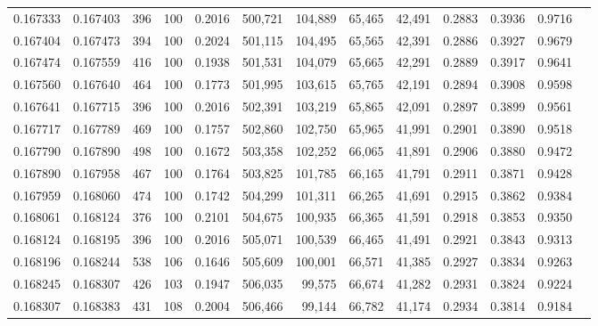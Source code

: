\begin{tabular}{rrrrrrrrrrrrr}
0.167333 & 0.167403 &   396 & 100 &                                     0.2016 & 500,721 & 104,889 &  65,465 &  42,491 & 0.2883 & 0.3936 & 0.9716 \\
0.167404 & 0.167473 &   394 & 100 &                                     0.2024 & 501,115 & 104,495 &  65,565 &  42,391 & 0.2886 & 0.3927 & 0.9679 \\
0.167474 & 0.167559 &   416 & 100 &                                     0.1938 & 501,531 & 104,079 &  65,665 &  42,291 & 0.2889 & 0.3917 & 0.9641 \\
0.167560 & 0.167640 &   464 & 100 &                                     0.1773 & 501,995 & 103,615 &  65,765 &  42,191 & 0.2894 & 0.3908 & 0.9598 \\
0.167641 & 0.167715 &   396 & 100 &                                     0.2016 & 502,391 & 103,219 &  65,865 &  42,091 & 0.2897 & 0.3899 & 0.9561 \\
0.167717 & 0.167789 &   469 & 100 &                                     0.1757 & 502,860 & 102,750 &  65,965 &  41,991 & 0.2901 & 0.3890 & 0.9518 \\
0.167790 & 0.167890 &   498 & 100 &                                     0.1672 & 503,358 & 102,252 &  66,065 &  41,891 & 0.2906 & 0.3880 & 0.9472 \\
0.167890 & 0.167958 &   467 & 100 &                                     0.1764 & 503,825 & 101,785 &  66,165 &  41,791 & 0.2911 & 0.3871 & 0.9428 \\
0.167959 & 0.168060 &   474 & 100 &                                     0.1742 & 504,299 & 101,311 &  66,265 &  41,691 & 0.2915 & 0.3862 & 0.9384 \\
0.168061 & 0.168124 &   376 & 100 &                                     0.2101 & 504,675 & 100,935 &  66,365 &  41,591 & 0.2918 & 0.3853 & 0.9350 \\
0.168124 & 0.168195 &   396 & 100 &                                     0.2016 & 505,071 & 100,539 &  66,465 &  41,491 & 0.2921 & 0.3843 & 0.9313 \\
0.168196 & 0.168244 &   538 & 106 &                                     0.1646 & 505,609 & 100,001 &  66,571 &  41,385 & 0.2927 & 0.3834 & 0.9263 \\
0.168245 & 0.168307 &   426 & 103 &                                     0.1947 & 506,035 &  99,575 &  66,674 &  41,282 & 0.2931 & 0.3824 & 0.9224 \\
0.168307 & 0.168383 &   431 & 108 &                                     0.2004 & 506,466 &  99,144 &  66,782 &  41,174 & 0.2934 & 0.3814 & 0.9184 \\

\end{tabular}
